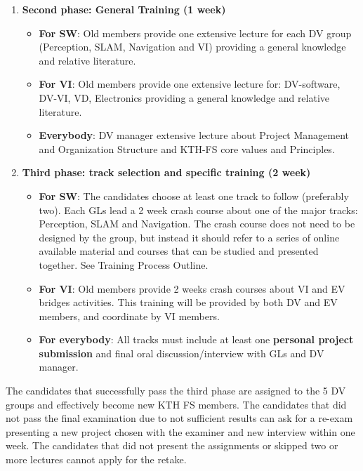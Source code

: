 \documentclass[graybox]{svmult}
\begin{document}
\begin{enumerate}
\item \textbf{Second phase: General Training (1 week)}
\begin{itemize}
\item \textbf{For SW}: Old members provide one extensive lecture for each DV group (Perception, SLAM, Navigation and VI) providing a general knowledge and relative literature.
\item \textbf{For VI}: Old members provide one extensive lecture for: DV-software, DV-VI, VD, Electronics providing a general knowledge and relative literature.
\item \textbf{Everybody}: DV manager extensive lecture about Project Management and Organization Structure and KTH-FS core values and Principles.
\end{itemize}

\item \textbf{Third phase: track selection and specific training (2 week)}
\begin{itemize}
\item \textbf{For SW}:
The candidates choose at least one track to follow (preferably two). Each GLs lead a 2 week crash course about one of the major tracks: Perception, SLAM and Navigation. The crash course does not need to be designed by the group, but instead it should refer to a series of online available material and courses that can be studied and presented together. See Training Process Outline.
\item \textbf{For VI}:
Old members provide 2 weeks crash courses about VI and EV bridges activities. This training will be provided by both DV and EV members, and coordinate by VI members.
\item \textbf{For everybody}: 
All tracks must include at least one \textbf{personal project submission} and final oral discussion/interview with GLs and DV manager.
\end{itemize}
\end{enumerate}

The candidates that successfully pass the third phase are assigned to the 5 DV groups and effectively become new KTH FS members.
The candidates that did not pass the final examination due to not sufficient results can ask for a re-exam presenting a new project chosen with the examiner and new interview within one week.
The candidates that did not present the assignments or skipped two or more lectures cannot apply for the retake.
\end{document}
